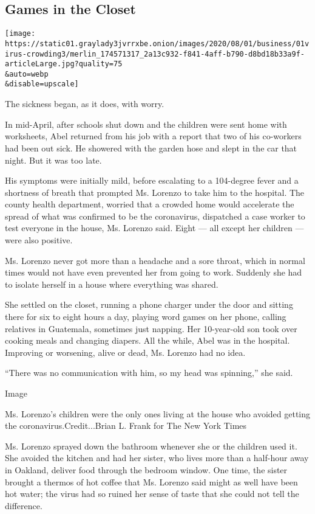 \hypertarget{games-in-the-closet}{%
\subsection{Games in the Closet}\label{games-in-the-closet}}

\texttt{[image: https://static01.graylady3jvrrxbe.onion/images/2020/08/01/business/01virus-crowding3/merlin\_174571317\_2a13c932-f841-4aff-b790-d8bd18b33a9f-articleLarge.jpg?quality=75\\\&auto=webp\\\&disable=upscale]}

The sickness began, as it does, with worry.

In mid-April, after schools shut down and the children were sent home
with worksheets, Abel returned from his job with a report that two of
his co-workers had been out sick. He showered with the garden hose and
slept in the car that night. But it was too late.

His symptoms were initially mild, before escalating to a 104-degree
fever and a shortness of breath that prompted Ms. Lorenzo to take him to
the hospital. The county health department, worried that a crowded home
would accelerate the spread of what was confirmed to be the coronavirus,
dispatched a case worker to test everyone in the house, Ms. Lorenzo
said. Eight --- all except her children --- were also positive.

Ms. Lorenzo never got more than a headache and a sore throat, which in
normal times would not have even prevented her from going to work.
Suddenly she had to isolate herself in a house where everything was
shared.

She settled on the closet, running a phone charger under the door and
sitting there for six to eight hours a day, playing word games on her
phone, calling relatives in Guatemala, sometimes just napping. Her
10-year-old son took over cooking meals and changing diapers. All the
while, Abel was in the hospital. Improving or worsening, alive or dead,
Ms. Lorenzo had no idea.

``There was no communication with him, so my head was spinning,'' she
said.

Image

Ms. Lorenzo's children were the only ones living at the house who
avoided getting the coronavirus.Credit...Brian L. Frank for The New York
Times

Ms. Lorenzo sprayed down the bathroom whenever she or the children used
it. She avoided the kitchen and had her sister, who lives more than a
half-hour away in Oakland, deliver food through the bedroom window. One
time, the sister brought a thermos of hot coffee that Ms. Lorenzo said
might as well have been hot water; the virus had so ruined her sense of
taste that she could not tell the difference.


